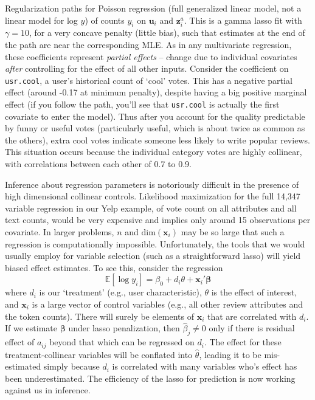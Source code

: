\documentclass[12pt]{article}
\newcommand{\bs}[1]{\boldsymbol{#1}}
\newcommand{\mr}[1]{\mathrm{#1}}
\newcommand{\bm}[1]{\mathbf{#1}}
\newcommand{\ds}[1]{\mathds{#1}}
\newcommand{\cd}[1]{{\tt#1}}
\begin{document}
Regularization paths for
Poisson regression (full generalized linear model, not a linear model for
log $y$) of  counts $y_i$ on   $\bm{u}_i$ and
$\bm{z}^a_i$.  This is a gamma lasso fit with $\gamma =10$, for a very concave
penalty (little bias), such that estimates at the end of the path
are near the corresponding MLE.  As in any multivariate regression, these coefficients
represent {\it partial effects} --  change due to
 individual covariates {\it after} controlling for the effect of all other
inputs.  Consider the coefficient on \cd{usr.cool}, a user's historical
count of `cool' votes.  This has a negative partial effect (around -0.17 at
minimum penalty), despite having a big positive marginal effect (if you follow
the path, you'll see that \cd{usr.cool} is actually the first covariate to
enter the model).  Thus after you account for the quality
predictable by funny or useful votes (particularly useful, which is about
twice as common as the others), extra cool votes indicate someone less likely
to write popular reviews.  This situation occurs because the individual
category votes are highly collinear, with correlations between each other of
0.7 to 0.9.

Inference about regression parameters is notoriously difficult in the presence of high dimensional collinear controls.  Likelihood maximization for the full 14,347
variable regression in our Yelp example, of vote count on all attributes and all text counts,  would be very expensive and implies only around 15 observations per covariate.  
In larger problems, $n$ and $\mr{dim}(\bm{x}_i)$ may be so large that such a regression is computationally impossible.
Unfortunately, the tools that we would usually employ for variable selection (such as a straightforward lasso) will yield biased effect estimates.  To see this, consider
the regression 
\begin{equation}\label{teffects}
\ds{E}[\log y_i] = \beta_0 + d_i\theta  + \bm{x}_i'\bs{\beta}
\end{equation}
where $d_i$ is our `treatment' (e.g., user characteristic), $\theta$ is
the effect of interest, and $\bm{x}_i$ is a large vector of control
variables (e.g., all other review attributes and the token counts).   There
will surely be elements of $\bm{x}_i$ that are correlated with $d_i$. If
we estimate $\bs{\beta}$ under lasso penalization, 
then $\hat\beta_j \neq 0$ only if there is 
residual effect of $a_{ij}$ beyond that which can be regressed on $d_i$.  The
 effect for these treatment-collinear variables will be conflated
into $\hat\theta$, leading it to be mis-estimated simply because $d_i$ is correlated with many
variables who's effect has been underestimated.  The efficiency of the lasso
for prediction is now working against us in inference.
\end{document}

